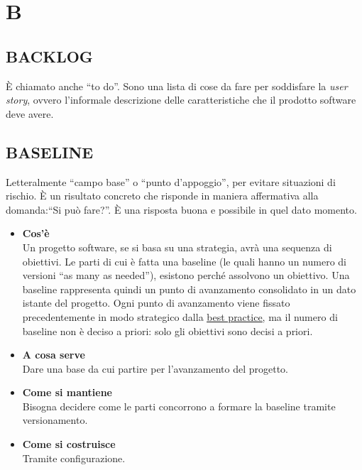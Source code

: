 \newpage
	\section{B} \label{sec:B}

		\subsection{BACKLOG}  \label{backlog}
		È chiamato anche ``to do''. Sono una lista di cose da fare per soddisfare la \textit{user story}, ovvero l'informale descrizione delle caratteristiche che il prodotto software deve avere.


		\subsection{BASELINE}   \label{baseline}
		Letteralmente ``campo base'' o ``punto d'appoggio'', per evitare situazioni di rischio. È un risultato concreto che risponde in maniera affermativa alla domanda:``Si può fare?''. È una risposta buona e possibile in quel dato momento.
		\begin{itemize}
			\item \textbf{Cos'è} \\
			Un progetto software, se si basa su una strategia, avrà una sequenza di obiettivi. Le parti di cui è fatta una baseline (le quali hanno un numero di versioni ``as many as needed''), esistono perché assolvono un obiettivo. Una baseline rappresenta quindi un punto di avanzamento consolidato in un dato istante del progetto. Ogni punto di avanzamento viene fissato precedentemente in modo strategico dalla \underline{\hyperref[best]{best practice}}, ma il numero di baseline non è deciso a priori: solo gli obiettivi sono decisi a priori.
			\item \textbf{A cosa serve} \\
			Dare una base da cui partire per l'avanzamento del progetto.
			\item \textbf{Come si mantiene} \\
			Bisogna decidere come le parti concorrono a formare la baseline tramite versionamento.
			\item \textbf{Come si costruisce} \\
			Tramite configurazione.
		\end{itemize}



